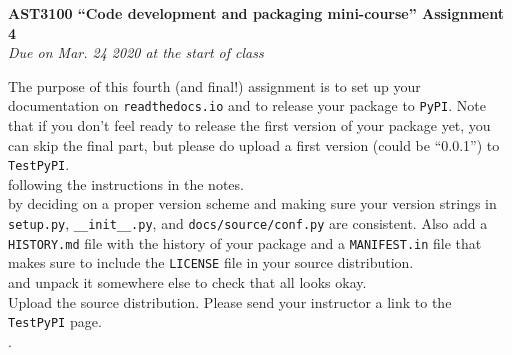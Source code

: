 \documentclass[12pt]{article}
\begin{document}
\begin{center}
{\bf \LARGE AST3100 ``Code development and packaging mini-course'' Assignment 4}\\[7pt]
\emph{Due on Mar. 24 2020  at the start of class}\\[7pt]
\end{center}

The purpose of this fourth (and final!) assignment is to set up your
documentation on \texttt{readthedocs.io} and to release your package
to \texttt{PyPI}. Note that if you don't feel ready to release the
first version of your package yet, you can skip the final part, but
please do upload a first version (could be ``0.0.1'') to
\texttt{TestPyPI}.\\

 following the instructions in the notes.\\

by deciding on a proper version scheme and making sure your version
strings in \texttt{setup.py}, \texttt{\_\_init\_\_.py}, and
\texttt{docs/source/conf.py} are consistent. Also add a
\texttt{HISTORY.md} file with the history of your package and a
\texttt{MANIFEST.in} file that makes sure to include the
\texttt{LICENSE} file in your source distribution.\\

 and unpack it somewhere else to check that all looks okay.\\

 Upload the source
distribution. Please send your instructor a link to the
\texttt{TestPyPI} page.\\

.\\

\end{document}
